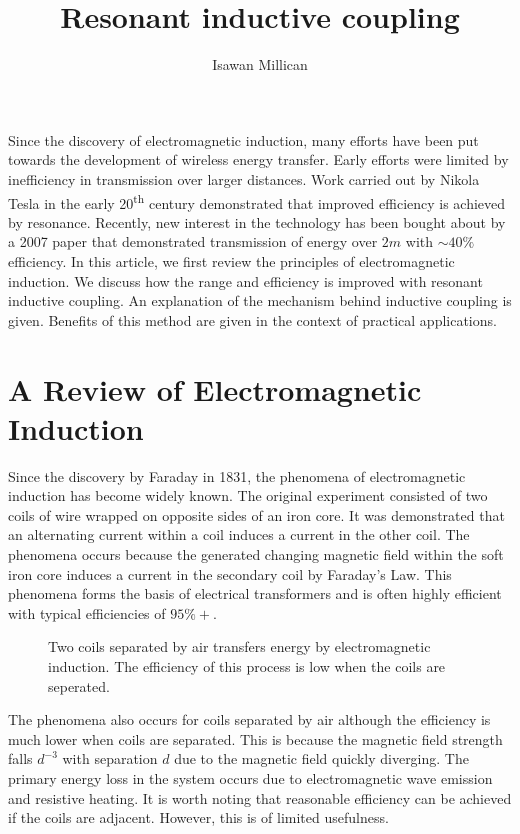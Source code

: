 \documentclass[a4paper,justified,nobib]{tufte-handout}
\begin{document}
\title{Resonant inductive coupling}
\author{Isawan Millican}
\maketitle

Since the discovery of electromagnetic induction,
many efforts have been put towards the development of wireless energy transfer.
Early efforts were limited by inefficiency in transmission over larger distances.
Work carried out by Nikola Tesla in the early 20\textsuperscript{th} century
demonstrated that improved efficiency is achieved by resonance.\cite{tesla}
Recently, new interest in the technology has been bought about by a 2007
paper that demonstrated transmission of energy over $2m$ with $\sim40\%$ efficiency.
In this article, we first review the principles of electromagnetic induction.
We discuss how the range and efficiency is improved with
resonant inductive coupling.
An explanation of the mechanism behind inductive coupling is given.
Benefits of this method are given in the context of practical applications.



\section{A Review of Electromagnetic Induction}

Since the discovery by Faraday in 1831,
the phenomena of electromagnetic induction has become widely known. 
\cite{faradaypublishedfirst}
The original experiment consisted of two coils of wire wrapped on opposite
sides of an iron core.
It was demonstrated that an alternating current within a coil induces
a current in the other coil.
The phenomena occurs because the generated changing magnetic
field within the soft iron core induces a current in the secondary coil by
Faraday's Law.
This phenomena forms the basis of electrical transformers and
is often highly efficient with typical efficiencies of $95\%+$.

\begin{figure}
  \center
  
  \caption{Two coils separated by air transfers energy by
  electromagnetic induction.
  The efficiency of this process is low when the coils are seperated.}
\end{figure}

The phenomena also occurs for coils separated by air
although the efficiency is much lower when coils are separated.
This is because the magnetic field strength falls $d^{-3}$ with separation $d$
due to the magnetic field quickly diverging.
The primary energy loss in the system occurs due to electromagnetic wave emission
and resistive heating.
It is worth noting that reasonable efficiency can be achieved if the coils
are adjacent.
However, this is of limited usefulness.
\end{document}
